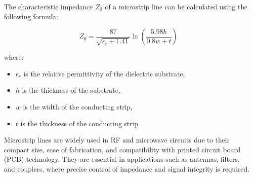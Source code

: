 The characteristic impedance \( Z_0 \) of a microstrip line can be calculated using the following formula:

\[
Z_0 = \frac{87}{\sqrt{\epsilon_r + 1.41}} \ln \left( \frac{5.98h}{0.8w + t} \right)
\]

where:
\begin{itemize}
    \item \( \epsilon_r \) is the relative permittivity of the dielectric substrate,
    \item \( h \) is the thickness of the substrate,
    \item \( w \) is the width of the conducting strip,
    \item \( t \) is the thickness of the conducting strip.
\end{itemize}

Microstrip lines are widely used in RF and microwave circuits due to their compact size, ease of fabrication, and compatibility with printed circuit board (PCB) technology. They are essential in applications such as antennas, filters, and couplers, where precise control of impedance and signal integrity is required.

